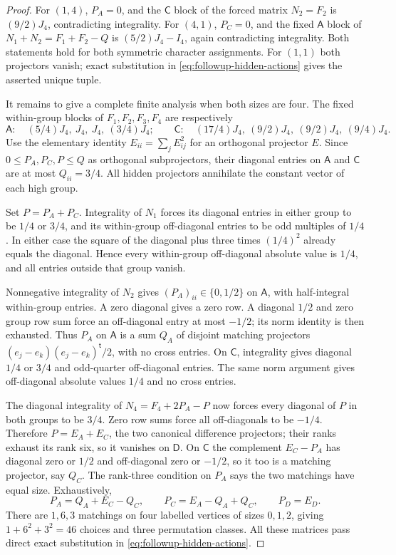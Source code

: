 \begin{proof}
For $(1,4)$, $P_A=0$, and the $\mathsf C$ block of the forced matrix
$N_2=F_2$ is $(9/2)J_4$, contradicting integrality.
For $(4,1)$, $P_C=0$, and the fixed $\mathsf A$ block of
$N_1+N_2=F_1+F_2-Q$ is $(5/2)J_4-I_4$, again contradicting
integrality.  Both statements hold for both symmetric character
assignments.  For $(1,1)$ both projectors vanish; exact substitution
in \eqref{eq:followup-hidden-actions} gives the asserted unique tuple.

It remains to give a complete finite analysis when both sizes are four.
The fixed within-group blocks of $F_1,F_2,F_3,F_4$ are respectively
\[
 \mathsf A:\quad (5/4)J_4,\ J_4,\ J_4,\ (3/4)J_4;
 \qquad
 \mathsf C:\quad (17/4)J_4,\ (9/2)J_4,\ (9/2)J_4,\ (9/4)J_4.
\]
Use the elementary identity $E_{ii}=\sum_jE_{ij}^2$ for an
orthogonal projector $E$.  Since $0\le P_A,P_C,P\le Q$ as
orthogonal subprojectors, their diagonal entries on $\mathsf A$ and
$\mathsf C$ are at most $Q_{ii}=3/4$.
All hidden projectors annihilate the
constant vector of each high group.

Set $P=P_A+P_C$.  Integrality of $N_1$ forces its diagonal entries
in either group to be $1/4$ or $3/4$, and its within-group
off-diagonal entries to be odd multiples of $1/4$.  In either case
the square of the diagonal plus three times $(1/4)^2$ already equals
the diagonal.  Hence every within-group off-diagonal absolute value
is $1/4$, and all entries outside that group vanish.

Nonnegative integrality of $N_2$ gives $(P_A)_{ii}\in\{0,1/2\}$
on $\mathsf A$, with half-integral within-group entries.  A zero
diagonal gives a zero row.  A diagonal $1/2$ and zero group row sum
force an off-diagonal entry at most $-1/2$; its norm identity is then
exhausted.  Thus $P_A$ on $\mathsf A$ is a sum $Q_A$ of disjoint
matching projectors $(e_j-e_k)(e_j-e_k)^{\mathsf t}/2$, with no
cross entries.  On $\mathsf C$, integrality gives diagonal $1/4$
or $3/4$ and odd-quarter off-diagonal entries.  The same norm argument
gives off-diagonal absolute values $1/4$ and no cross entries.

The diagonal integrality of $N_4=F_4+2P_A-P$ now forces every
diagonal of $P$ in both groups to be $3/4$.  Zero row sums force
all off-diagonals to be $-1/4$.  Therefore $P=E_A+E_C$, the two
canonical difference projectors; their ranks exhaust its rank six,
so it vanishes on $\mathsf D$.  On $\mathsf C$ the complement
$E_C-P_A$ has diagonal zero or $1/2$ and off-diagonal zero or
$-1/2$, so it too is a matching projector, say $Q_C$.
The rank-three condition on $P_A$ says the two matchings have equal
size.  Exhaustively,
\[
 P_A=Q_A+E_C-Q_C,\qquad
 P_C=E_A-Q_A+Q_C,\qquad P_D=E_D.
\]
There are $1,6,3$ matchings on four labelled vertices of sizes
$0,1,2$, giving $1+6^2+3^2=46$ choices and three permutation classes.
All these matrices pass direct exact substitution in
\eqref{eq:followup-hidden-actions}.


\end{proof}
